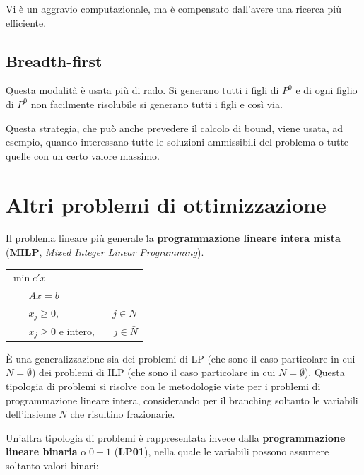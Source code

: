 \documentclass[11pt]{book}
\begin{document}
Vi \`e un aggravio computazionale, ma \`e compensato dall'avere una
ricerca pi\`u efficiente.

\subsection{Breadth-first}

Questa modalit\`a \`e usata pi\`u di rado. Si generano tutti i figli
di $P^0$ e di ogni figlio di $P^0$ non facilmente risolubile si
generano tutti i figli e cos\`i via.

Questa strategia, che pu\`o anche prevedere il calcolo di bound, viene
usata, ad esempio, quando interessano tutte le soluzioni ammissibili
del problema o tutte quelle con un certo valore massimo. 

\section{Altri problemi di ottimizzazione}

Il problema lineare pi\`u generale \` la {\bf programmazione lineare
  intera mista} ({\bf MILP}, {\em Mixed Integer Linear Programming}).

\vspace{11pt}
\begin{center}
  \begin{tabular}{l}
    $\min c'x$\\
    $\phantom{min}Ax = b$\\
    $\phantom{min}x_j \geq 0,\phantom{aaaaaaaaaa}j \in N$\\
    $\phantom{min}x_j \geq 0 $ e intero, $\phantom{aaa}j \in \bar{N}$\\
  \end{tabular}
\end{center}
\vspace{11pt}

\`E una generalizzazione sia dei problemi di LP (che sono il caso
particolare in cui $\bar{N} = \emptyset$) dei problemi di ILP (che
sono il caso particolare in cui $N = \emptyset$). Questa tipologia di
problemi si risolve con le metodologie viste per i problemi di
programmazione lineare intera, considerando per il branching soltanto
le variabili dell'insieme $\bar{N}$ che risultino frazionarie.

Un'altra tipologia di problemi \`e rappresentata invece dalla {\bf
  programmazione lineare binaria} o $0-1$ ({\bf LP01}), nella quale le
variabili possono assumere soltanto valori binari:
\end{document}
